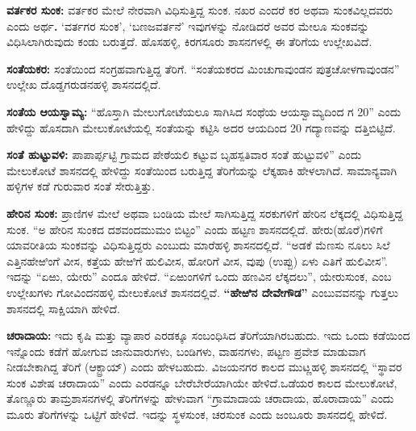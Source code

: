 \textbf{ವರ್ತಕರ ಸುಂಕ:} ವರ್ತಕರ ಮೇಲೆ ನೇರವಾಗಿ ವಿಧಿಸುತ್ತಿದ್ದ ಸುಂಕ. ನಖರ ಎಂದರೆ ಕರ ಅಥವಾ ಸುಂಕವಿಲ್ಲದವರು ಎಂದು ಅರ್ಥ\textbf{. }‘ವರ್ತಗರ ಸುಂಕ’, ‘ಬಣಜವರ್ತನೆ’ ಇವುಗಳನ್ನು ನೋಡಿದರೆ ಅವರ ಮೇಲೂ ಸುಂಕವನ್ನು ವಿಧಿಸಿಲಾಗಿರುವುದು ಕಂಡು ಬರುತ್ತದೆ. ಹೊಸಹಳ್ಳಿ, ಕಿರಗಸೂರು ಶಾಸನಗಳಲ್ಲಿ ಈ ತೆರಿಗೆಯ ಉಲ್ಲೇಖವಿದೆ.

\textbf{ಸಂತೆಯಕರ:} ಸಂತೆಯಿಂದ ಸಂಗ್ರಹವಾಗುತ್ತಿದ್ದ ತೆರಿಗೆ. “ಸಂತೆಯಕರದ ಮಿಂಚುಗಾವುಂಡನ ಪುತ್ರ\break ಚೋಳಗಾವುಂಡನ” ಉಲ್ಲೇಖ ದೊಡ್ಡಗರುಡನಹಳ್ಳಿ ಶಾಸನದಲ್ಲಿದೆ.

\textbf{ಸಂತೆಯ ಆಯಸ್ವಾಮ್ಯ:} “ಹೊಸ್ತಾಗಿ ಮೇಲುಗೋಟೆಯಲೂ ಸಾಗಿಸಿದ ಸಂಥೆಯ ಆಯಸ್ವಾಮ್ಯದಿಂದ ಗ 20” ಎಂದು ಹೇಳಿದ್ದು ಹೊಸದಾಗಿ ಮೇಲುಕೋಟೆಯಲ್ಲಿ ಸಂತೆಯನ್ನು ಕಟ್ಟಿಸಿ ಅದರ ಆಯದಿಂದ 20 ಗದ್ಯಾಣವನ್ನು ದತ್ತಿಬಿಟ್ಟಿದೆ.

\textbf{ಸಂತೆ ಹುಟ್ಟುವಳಿ:} ಪಾಪಾರ್ಪ್ಪಟ್ಟಿ ಗ್ರಾಮದ ಪೇಠೆಯಲಿ ಕಟ್ಟುವ ಬೃಹಸ್ಪತಿವಾರ ಸಂತೆ ಹುಟ್ಟುವಳಿ” ಎಂದು ಮೇಲುಕೋಟೆ ಶಾಸನದಲ್ಲಿ ಹೇಳಿದ್ದು ಸಂತೆಯಿಂದ ಬರುತ್ತಿದ್ದ ತೆರಿಗೆಯನ್ನು ಲೆಕ್ಕಹಾಕಿ ಹೇಳಲಾಗಿದೆ. ಸಾಮಾನ್ಯವಾಗಿ ಹಳ್ಳಿಗಳ ಕಡೆ ಗುರುವಾರ ಸಂತೆ ಸೇರುತ್ತಿತ್ತು.

\textbf{ಹೇರಿನ ಸುಂಕ:} ಪ್ರಾಣಿಗಳ ಮೇಲೆ ಅಥವಾ ಬಂಡಿಯ ಮೇಲೆ ಸಾಗಿಸುತ್ತಿದ್ದ ಸರಕುಗಳಿಗೆ ಹೇರಿನ ಲೆಕ್ಕದಲ್ಲಿ ವಿಧಿಸುತ್ತಿದ್ದ ಸುಂಕ. “ಅ ಹೇರಿನ ಸುಂಕದ ದಶವಂದಮುಮಂ ಬಿಟ್ಟಂ” ಎಂದು ಹಟ್ಟಣ ಶಾಸನದಲ್ಲಿದೆ. ಹೇರು(ಹೊರೆ)ಗಳಿಗೆ ಯಾವರೀತಿಯ ಸುಂಕವನ್ನು ವಿಧಿಸುತ್ತಿದ್ದರು ಎಂಬುದು ಮಾರೆಹಳ್ಳಿ ಶಾಸನದಲ್ಲಿದೆ. “ಅಡಕೆ ಮೆಣಸು ನೂಲು ಸಿಲೆ ಎತ್ತಿನಹೇಱಿಂಗೆ ವೀಸ, ಕತ್ತೆಯ ಹೇಱಿಗೆ ಹುಲಿವೀಸ, ಹೋರಿಗೆ ವೀಸ, ವುಪು (ಉಪ್ಪು) ಏಳು ಎತಿಗೆ ಹುಲಿವೀಸ”. ಇದನ್ನು “ಏಱು, ಯೇರು” ಎಂದೂ ಹೇಳಿದೆ. “ಏಱುಂಗಳಿಗೆ ಒಂದು ಹಣವಿನ ಲೆಕ್ಕದಲು”, ಯೇರುಸುಂಕ, ಎಂಬ ಉಲ್ಲೇಖಗಳು ಗೋವಿಂದನಹಳ್ಳಿ ಮೇಲುಕೋಟೆ ಶಾಸನದಲ್ಲಿವೆ. \textbf{“ಹೇಱಿನ ದೇವೇಗೌಡ”} ಎಂಬುವವನನ್ನು ಗುತ್ತಲು ಶಾಸನದಲ್ಲಿ ಸಾಕ್ಷಿಯಾಗಿ ಹೇಳಿದೆ.

\textbf{ಚರಾದಾಯ:} ಇದು ಕೃಷಿ ಮತ್ತು ವ್ಯಾಪಾರ ಎರಡಕ್ಕೂ ಸಂಬಂಧಿಸಿದ ತೆರಿಗೆಯಾಗಿರಬಹುದು. ಇದು ಒಂದು ಕಡೆಯಿಂದ ಇನ್ನೊಂದು ಕಡೆಗೆ ಹೋಗುವ ಜಾನುವಾರುಗಳು, ಬಂಡಿಗಳು, ವಾಹನಗಳು, ಪಟ್ಟಣ ಪ್ರವೇಶ ಮಾಡುವಾಗ ನೀಡಬೇಕಾಗಿದ್ದ ತೆರಿಗೆ (ಆಕ್ಟ್ರಾಯ್​) ಎಂದು ಹೇಳಬಹುದು. ವಿಜಯನಗರ ಕಾಲದ ಮುಟ್ಣಹಳ್ಳಿ ಶಾಸನದಲ್ಲಿ “ಸ್ಥಾವರ ಸುಂಕ ವಿಶೇಷ ಚರಾದಾಯ” ಎಂದು ಎರಡನ್ನೂ ಬೇರೆಬೇರೆಯಾಗಿಯೇ ಹೇಳಿದೆ.ಒಡೆಯರ ಕಾಲದ ಮೇಲುಕೋಟೆ, ತೊಣ್ಣೂರು ತಾಮ್ರಶಾಸನಗಳಲ್ಲಿ ತೆರಿಗೆಗಳನ್ನು ಹೇಳುವಾಗ “ಗ್ರಾಮಾದಾಯ ಚರಾದಾಯ, ಹೊರಾದಾಯ” ಎಂದು ಮೂರು ತೆರಿಗೆಗಳನ್ನು ಒಟ್ಟಿಗೆ ಹೇಳಿದೆ. ಇದನ್ನು ಸ್ಥಳಸುಂಕ, ಚರಸುಂಕ ಎಂದು ಜಂಬೂರು ಶಾಸನದಲ್ಲಿ ಹೇಳಿದೆ.


